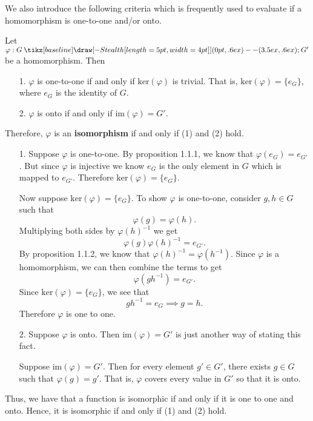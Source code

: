\documentclass[12pt,letterpaper]{algebra_book}
\renewcommand{\to}{\mathbin{\tikz[baseline] \draw[-{Stealth[length=5pt,width=4pt]}] (0pt,.6ex) -- (3.5ex,.6ex);}}
\renewcommand{\phi}{\varphi}
\theoremstyle{definition}
\begin{document}
    We also introduce the following criteria which is frequently used
    to evaluate if a homomorphism is one-to-one and/or onto. 
    
    \begin{thm}\label{theorem_isomorph}
        Let $\phi: G \to G'$ be a homomorphism.
        Then 
        \begin{itemize}
            \item[1.] $\phi$ is one-to-one if and only if
            $\mbox{ker}(\phi)$ is trivial. That is, $\mbox{ker}(\phi) = \{e_G\}$, where $e_G$ is
            the identity of $G$.

            \item[2.] $\phi$ is onto if and only if $\mbox{im}(\phi) = G'$. 
        \end{itemize}
        Therefore, $\phi$ is an \textbf{isomorphism} if and only if
        (1) and (2) hold.
    \end{thm}

    \begin{prf}
        \begin{itemize}
            \item[1.] Suppose $\phi$ is one-to-one. By proposition
            1.1.1, we know that $\phi(e_G) = e_{G'}$. But since $\phi$
            is injective we know $e_G$ is the only element in $G$
            which is mapped to $e_{G'}$. Therefore $\mbox{ker}(\phi) =
            \{e_G\}$.

            Now suppose $\mbox{ker}(\phi) = \{e_G\}$. To show $\phi$
            is one-to-one, consider
            $g, h \in G$ such that
            \[
                \phi(g) = \phi(h).
            \]
            Multiplying both sides by $\phi(h)^{-1}$ we get 
            \[
                \phi(g)\phi(h)^{-1} = e_{G'}.
            \]
            By proposition 1.1.2, we know that $\phi(h)^{-1} =
            \phi(h^{-1})$. Since $\phi$ is a homomorphism, we can then
           combine the terms to get 
           \[
                \phi(gh^{-1}) = e_{G'}.
           \] 
           Since $\mbox{ker}(\phi) = \{e_G\}$, we see that 
           \[
                gh^{-1} = e_G \implies g = h.                
           \]
           Therefore $\phi$ is one to one.
           
           \item[2.] Suppose $\phi$ is onto. Then $\mbox{im}(\phi) = G'$
           is just another way of stating this fact. 
           
           Suppose $\mbox{im}(\phi) = G'$. Then for every element $g'
           \in G'$, there exists $g \in G$ such that $\phi(g) = g'$.
           That is, $\phi$ covers every value in $G'$ so that it is
           onto.
        \end{itemize}
        Thus, we have that a function is isomorphic if and only if it
        is one to one and onto. Hence, it is isomorphic if and only if
        (1) and (2) hold.
    \end{prf}
\end{document}
